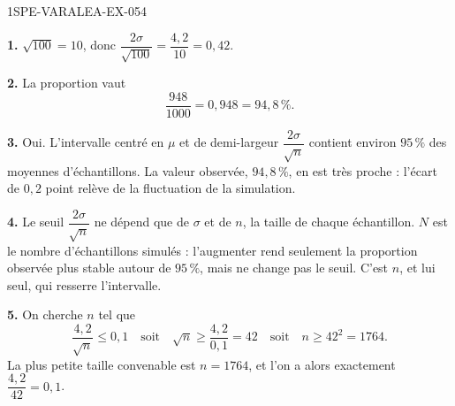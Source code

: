 \begin{corrige}{1SPE-VARALEA-EX-054}

\textbf{1.} $\sqrt{100} = 10$, donc
$\dfrac{2\sigma}{\sqrt{100}} = \dfrac{4{,}2}{10} = 0{,}42$.

\medskip
\textbf{2.} La proportion vaut
\[
\frac{948}{1000} = 0{,}948 = 94{,}8\,\%.
\]

\medskip
\textbf{3.} Oui. L'intervalle centré en $\mu$ et de demi-largeur
$\dfrac{2\sigma}{\sqrt{n}}$ contient environ $95\,\%$ des moyennes
d'échantillons. La valeur observée, $94{,}8\,\%$, en est très proche : l'écart
de $0{,}2$ point relève de la fluctuation de la simulation.

\medskip
\textbf{4.} Le seuil $\dfrac{2\sigma}{\sqrt{n}}$ ne dépend que de $\sigma$ et de
$n$, la taille de chaque échantillon. $N$ est le nombre d'échantillons simulés :
l'augmenter rend seulement la proportion observée plus stable autour de
$95\,\%$, mais ne change pas le seuil. C'est $n$, et lui seul, qui resserre
l'intervalle.

\medskip
\textbf{5.} On cherche $n$ tel que
\[
\frac{4{,}2}{\sqrt{n}} \leq 0{,}1
\quad\text{soit}\quad
\sqrt{n} \geq \frac{4{,}2}{0{,}1} = 42
\quad\text{soit}\quad
n \geq 42^2 = 1764.
\]
La plus petite taille convenable est $n = 1764$, et l'on a alors exactement
$\dfrac{4{,}2}{42} = 0{,}1$.

\end{corrige}
